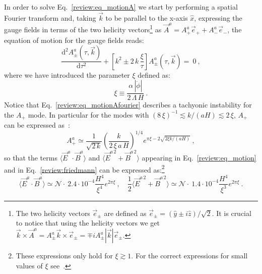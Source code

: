 In order to solve Eq.~\eqref{review:eq_motionA} we start by performing a spatial Fourier transform and, taking $\vec{k}$ to be parallel to the x-axis $\hat{x}$, expressing the gauge fields in terms of the two helicity vectors\footnote{The two helicity vectors $\vec{e}_{\pm}$ are defined as $\vec{e}_{\pm} = (\hat{y} \pm i \hat{z})/\sqrt{2}$. It is crucial to notice that using the helicity vectors we get $\vec{k} \times \vec{A}^a =  A^{a}_{\pm} \vec{k} \times \vec{e}_{\pm} = \mp i A^{a}_{\pm} |\vec{k}| \vec{e}_{\pm}$.} as $\vec{A}^a = A_{+}^a \vec{e}_{+} + A_{-}^a \vec{e}_{-}$, the equation of motion for the gauge fields reads:
\begin{equation}
\label{review:eq_motionAfourier}
  \frac{\textrm{d}^2  A^{a}_{\pm}(\tau,\vec{k})}{\textrm{d} \tau^2}  + \left[ k^2 \pm 2\, k  \, \frac{\xi}{\tau} \right]A^{a}_{\pm}(\tau,\vec{k}) =  \ 0 \ , 
  \end{equation}
where we have introduced the parameter $\xi$ defined as:
\begin{equation}
\xi \equiv \frac{\alpha \, |\dot{\phi}|}{2 \, \Lambda \, H} \ .
\label{review:xi}
\end{equation}
Notice that Eq.~\eqref{review:eq_motionAfourier} describes a tachyonic instability for the $A_+$ mode. In particular for the modes with $(8 \, \xi)^{-1} \lesssim k/(aH) \lesssim 2 \, \xi$,  $A_+$ can be expressed as~\cite{Anber:2009ua,Barnaby:2010vf,Barnaby:2011vw}:
\begin{equation}
A_+^a \simeq \frac{1}{\sqrt{2\, k}} \left( \frac{k}{2 \,  \xi \, a \, H}\right)^{1/4} e^{ \pi \xi - 2 \sqrt{2 \xi k/(a H)}} \ ,
\end{equation}
so that the terms $\langle \vec{E}^a \cdot \vec{B}^a \rangle$ and $\langle \vec{E}^{a \, 2} + \vec{B}^{a \, 2} \rangle$ appearing in Eq.~\eqref{review:eq_motion} and in Eq.~\eqref{review:friedmann} can be expressed as:\footnote{These expressions only hold for $\xi \gtrsim 1$. For the correct expressions for small values of $\xi$ see~\cite{Anber:2009ua,Pieroni:2016gdg}.}
\begin{equation}
\langle \vec{E}^a \cdot \vec{B}^a \rangle \simeq \mathcal{N} \cdot \   2.4 \cdot 10^{-4} \frac{H^4}{\xi^4} e^{2 \pi \xi} \ , \quad \frac{1}{2} \langle \vec{E}^{a \, 2} + \vec{B}^{a \, 2} \rangle  \simeq \mathcal{N} \cdot \   1.4 \cdot 10^{-4} \frac{H^4}{\xi^3} e^{2 \pi \xi} \ .
\end{equation}
